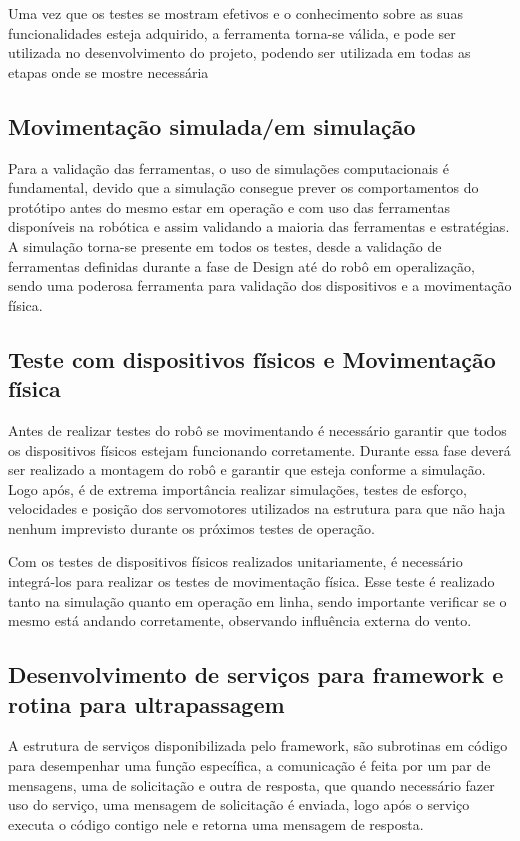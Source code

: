 Uma vez que os testes se mostram efetivos e o conhecimento sobre as suas funcionalidades esteja adquirido, a ferramenta torna-se válida, e pode ser utilizada no desenvolvimento do projeto, podendo ser utilizada em todas as etapas onde se mostre necessária

\subsection{Movimentação simulada/em simulação}
\label{ssec:mov_sim}
Para a validação das ferramentas, o uso de simulações computacionais é fundamental, devido que a simulação consegue prever os comportamentos do protótipo antes do mesmo estar em operação e com uso das ferramentas disponíveis na robótica e assim validando a maioria das ferramentas e estratégias. A simulação torna-se presente em todos os testes, desde a validação de ferramentas definidas durante a fase de Design até do robô em operalização, sendo uma poderosa ferramenta para validação dos dispositivos e a movimentação física.

\subsection{Teste com dispositivos físicos e Movimentação física}
\label{ssec:test_fis}
Antes de realizar testes do robô se movimentando é necessário garantir que todos os dispositivos físicos estejam funcionando corretamente. Durante essa fase deverá ser realizado a montagem do robô e garantir que esteja conforme a simulação. Logo após, é de extrema importância realizar simulações, testes de esforço, velocidades e posição dos servomotores utilizados na estrutura para que não haja nenhum imprevisto durante os próximos testes de operação. 

Com os testes de dispositivos físicos realizados unitariamente, é necessário integrá-los para realizar os testes de movimentação física. Esse teste é realizado tanto na simulação quanto em operação em linha, sendo importante verificar se o mesmo está andando corretamente, observando influência externa do vento. 

\subsection{Desenvolvimento de serviços para framework e rotina para ultrapassagem}
\label{ssec:serv_ultr}
A estrutura de serviços disponibilizada pelo framework, são subrotinas em código para desempenhar uma função específica, a comunicação é feita por um par de mensagens, uma de solicitação e outra de resposta, que quando necessário fazer uso do serviço, uma mensagem de solicitação é enviada, logo após o serviço executa o código contigo nele e retorna uma mensagem de resposta. 

